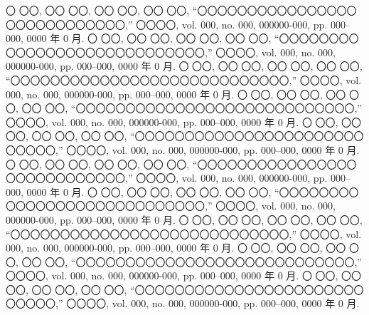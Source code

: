 \bunken

\begin{thebibliography}{9}
  〇 〇〇, 〇〇 〇〇, 〇〇 〇〇, 〇〇 〇〇, “〇〇〇〇〇〇〇〇〇〇〇〇〇〇〇〇〇〇〇〇〇〇〇〇〇〇〇〇,” 〇〇〇〇, vol. 000, no. 000, 000000-000, pp. 000--000, 0000 年 0 月.
  〇 〇〇, 〇〇 〇〇, 〇〇 〇〇, 〇〇 〇〇, “〇〇〇〇〇〇〇〇〇〇〇〇〇〇〇〇〇〇〇〇〇〇〇〇〇〇〇〇,” 〇〇〇〇, vol. 000, no. 000, 000000-000, pp. 000--000, 0000 年 0 月.
  〇 〇〇, 〇〇 〇〇, 〇〇 〇〇, 〇〇 〇〇, “〇〇〇〇〇〇〇〇〇〇〇〇〇〇〇〇〇〇〇〇〇〇〇〇〇〇〇〇,” 〇〇〇〇, vol. 000, no. 000, 000000-000, pp. 000--000, 0000 年 0 月.
  〇 〇〇, 〇〇 〇〇, 〇〇 〇〇, 〇〇 〇〇, “〇〇〇〇〇〇〇〇〇〇〇〇〇〇〇〇〇〇〇〇〇〇〇〇〇〇〇〇,” 〇〇〇〇, vol. 000, no. 000, 000000-000, pp. 000--000, 0000 年 0 月.
  〇 〇〇, 〇〇 〇〇, 〇〇 〇〇, 〇〇 〇〇, “〇〇〇〇〇〇〇〇〇〇〇〇〇〇〇〇〇〇〇〇〇〇〇〇〇〇〇〇,” 〇〇〇〇, vol. 000, no. 000, 000000-000, pp. 000--000, 0000 年 0 月.
  〇 〇〇, 〇〇 〇〇, 〇〇 〇〇, 〇〇 〇〇, “〇〇〇〇〇〇〇〇〇〇〇〇〇〇〇〇〇〇〇〇〇〇〇〇〇〇〇〇,” 〇〇〇〇, vol. 000, no. 000, 000000-000, pp. 000--000, 0000 年 0 月.
  〇 〇〇, 〇〇 〇〇, 〇〇 〇〇, 〇〇 〇〇, “〇〇〇〇〇〇〇〇〇〇〇〇〇〇〇〇〇〇〇〇〇〇〇〇〇〇〇〇,” 〇〇〇〇, vol. 000, no. 000, 000000-000, pp. 000--000, 0000 年 0 月.
  〇 〇〇, 〇〇 〇〇, 〇〇 〇〇, 〇〇 〇〇, “〇〇〇〇〇〇〇〇〇〇〇〇〇〇〇〇〇〇〇〇〇〇〇〇〇〇〇〇,” 〇〇〇〇, vol. 000, no. 000, 000000-000, pp. 000--000, 0000 年 0 月.
  〇 〇〇, 〇〇 〇〇, 〇〇 〇〇, 〇〇 〇〇, “〇〇〇〇〇〇〇〇〇〇〇〇〇〇〇〇〇〇〇〇〇〇〇〇〇〇〇〇,” 〇〇〇〇, vol. 000, no. 000, 000000-000, pp. 000--000, 0000 年 0 月.
  〇 〇〇, 〇〇 〇〇, 〇〇 〇〇, 〇〇 〇〇, “〇〇〇〇〇〇〇〇〇〇〇〇〇〇〇〇〇〇〇〇〇〇〇〇〇〇〇〇,” 〇〇〇〇, vol. 000, no. 000, 000000-000, pp. 000--000, 0000 年 0 月.
\end{thebibliography}
